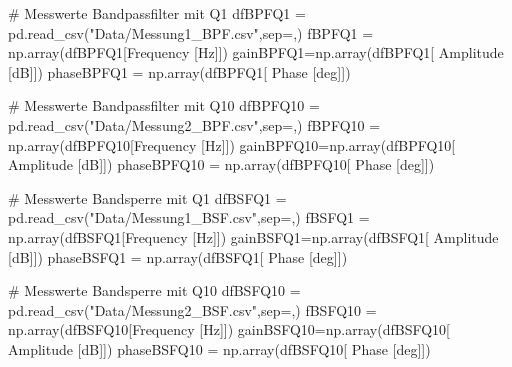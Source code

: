 \documentclass[
  ngerman,
  letterpaper,
  DIV=11]{scrreprt}
\newenvironment{Shaded}{}{}
\newcommand{\CommentTok}[1]{\textcolor[rgb]{0.42,0.45,0.49}{#1}}
\newcommand{\NormalTok}[1]{\textcolor[rgb]{0.14,0.16,0.18}{#1}}
\newcommand{\OperatorTok}[1]{\textcolor[rgb]{0.14,0.16,0.18}{#1}}
\newcommand{\StringTok}[1]{\textcolor[rgb]{0.01,0.18,0.38}{#1}}
\begin{document}
\begin{Shaded}
\begin{Highlighting}[]
\CommentTok{\# Messwerte Bandpassfilter mit Q1}
\NormalTok{dfBPFQ1 }\OperatorTok{=}\NormalTok{ pd.read\_csv(}\StringTok{"Data/Messung1\_BPF.csv"}\NormalTok{,sep}\OperatorTok{=}\StringTok{\textquotesingle{},\textquotesingle{}}\NormalTok{)}
\NormalTok{fBPFQ1 }\OperatorTok{=}\NormalTok{ np.array(dfBPFQ1[}\StringTok{\textquotesingle{}Frequency [Hz]\textquotesingle{}}\NormalTok{])}
\NormalTok{gainBPFQ1}\OperatorTok{=}\NormalTok{np.array(dfBPFQ1[}\StringTok{\textquotesingle{} Amplitude [dB]\textquotesingle{}}\NormalTok{])}
\NormalTok{phaseBPFQ1 }\OperatorTok{=}\NormalTok{ np.array(dfBPFQ1[}\StringTok{\textquotesingle{} Phase [deg]\textquotesingle{}}\NormalTok{])}

\CommentTok{\# Messwerte Bandpassfilter mit Q10}
\NormalTok{dfBPFQ10 }\OperatorTok{=}\NormalTok{ pd.read\_csv(}\StringTok{"Data/Messung2\_BPF.csv"}\NormalTok{,sep}\OperatorTok{=}\StringTok{\textquotesingle{},\textquotesingle{}}\NormalTok{)}
\NormalTok{fBPFQ10 }\OperatorTok{=}\NormalTok{ np.array(dfBPFQ10[}\StringTok{\textquotesingle{}Frequency [Hz]\textquotesingle{}}\NormalTok{])}
\NormalTok{gainBPFQ10}\OperatorTok{=}\NormalTok{np.array(dfBPFQ10[}\StringTok{\textquotesingle{} Amplitude [dB]\textquotesingle{}}\NormalTok{])}
\NormalTok{phaseBPFQ10 }\OperatorTok{=}\NormalTok{ np.array(dfBPFQ10[}\StringTok{\textquotesingle{} Phase [deg]\textquotesingle{}}\NormalTok{])}

\CommentTok{\# Messwerte Bandsperre mit Q1}
\NormalTok{dfBSFQ1 }\OperatorTok{=}\NormalTok{ pd.read\_csv(}\StringTok{"Data/Messung1\_BSF.csv"}\NormalTok{,sep}\OperatorTok{=}\StringTok{\textquotesingle{},\textquotesingle{}}\NormalTok{)}
\NormalTok{fBSFQ1 }\OperatorTok{=}\NormalTok{ np.array(dfBSFQ1[}\StringTok{\textquotesingle{}Frequency [Hz]\textquotesingle{}}\NormalTok{])}
\NormalTok{gainBSFQ1}\OperatorTok{=}\NormalTok{np.array(dfBSFQ1[}\StringTok{\textquotesingle{} Amplitude [dB]\textquotesingle{}}\NormalTok{])}
\NormalTok{phaseBSFQ1 }\OperatorTok{=}\NormalTok{ np.array(dfBSFQ1[}\StringTok{\textquotesingle{} Phase [deg]\textquotesingle{}}\NormalTok{])}

\CommentTok{\# Messwerte Bandsperre mit Q10}
\NormalTok{dfBSFQ10 }\OperatorTok{=}\NormalTok{ pd.read\_csv(}\StringTok{"Data/Messung2\_BSF.csv"}\NormalTok{,sep}\OperatorTok{=}\StringTok{\textquotesingle{},\textquotesingle{}}\NormalTok{)}
\NormalTok{fBSFQ10 }\OperatorTok{=}\NormalTok{ np.array(dfBSFQ10[}\StringTok{\textquotesingle{}Frequency [Hz]\textquotesingle{}}\NormalTok{])}
\NormalTok{gainBSFQ10}\OperatorTok{=}\NormalTok{np.array(dfBSFQ10[}\StringTok{\textquotesingle{} Amplitude [dB]\textquotesingle{}}\NormalTok{])}
\NormalTok{phaseBSFQ10 }\OperatorTok{=}\NormalTok{ np.array(dfBSFQ10[}\StringTok{\textquotesingle{} Phase [deg]\textquotesingle{}}\NormalTok{])}
\end{Highlighting}
\end{Shaded}
\end{document}
